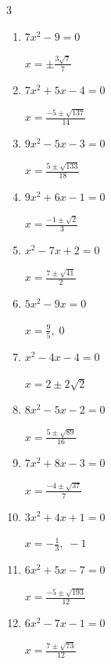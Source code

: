 \begin{multicols}{3}
\begin{enumerate}
        $\displaystyle x=\frac{5\pm \sqrt{133}}{6}$

  \item $7x^{2}-9=0$

        $\displaystyle x=\pm \frac{3\sqrt{7}}{7}$

  \item $7x^{2}+5x-4=0$

        $\displaystyle x=\frac{-5\pm \sqrt{137}}{14}$

\columnbreak %

  \item $9x^{2}-5x-3=0$

        $\displaystyle x=\frac{5\pm \sqrt{133}}{18}$

  \item $9x^{2}+6x-1=0$

        $\displaystyle x=\frac{-1\pm \sqrt{2}}{3}$

  \item $x^{2}-7x+2=0$

        $\displaystyle x=\frac{7\pm \sqrt{41}}{2}$

  \item $5x^{2}-9x=0$

        $\displaystyle x=\frac{9}{5}, \; 0$

  \item $x^{2}-4x-4=0$

        $\displaystyle x=2\pm 2\sqrt{2}$

  \item $8x^{2}-5x-2=0$

        $\displaystyle x=\frac{5\pm \sqrt{89}}{16}$

  \item $7x^{2}+8x-3=0$

        $\displaystyle x=\frac{-4\pm \sqrt{37}}{7}$

\columnbreak %

\resetques

  \item $3x^{2}+4x+1=0$

        $\displaystyle x=-\frac{1}{3}, \; -1$

  \item $6x^{2}+5x-7=0$

        $\displaystyle x=\frac{-5\pm \sqrt{193}}{12}$

  \item $6x^{2}-7x-1=0$

        $\displaystyle x=\frac{7\pm \sqrt{73}}{12}$


\end{enumerate}
\end{multicols}
